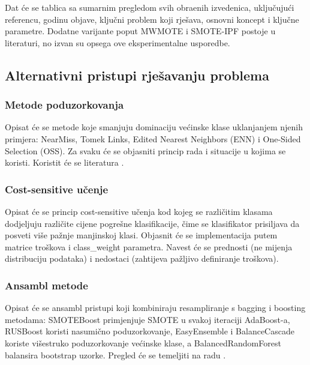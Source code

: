 Dat \'{c}e se tablica sa sumarnim pregledom svih obra\dj{}enih izvedenica,
uklju\v{c}uju\'{c}i referencu, godinu objave, klju\v{c}ni problem koji
rje\v{s}ava, osnovni koncept i klju\v{c}ne parametre. Dodatne varijante
poput MWMOTE \cite{barua2014} i SMOTE-IPF \cite{saez2015} postoje u
literaturi, no izvan su opsega ove eksperimentalne usporedbe.

\subsection{Alternativni pristupi rje\v{s}avanju problema}

\subsubsection{Metode poduzorkovanja}

Opisat \'{c}e se metode koje smanjuju dominaciju ve\'{c}inske klase
uklanjanjem njenih primjera: NearMiss, Tomek Links, Edited Nearest
Neighbors (ENN) i One-Sided Selection (OSS). Za svaku \'{c}e se objasniti
princip rada i situacije u kojima se koristi. Koristit \'{c}e se
literatura \cite{batista2004,liu2009}.

\subsubsection{Cost-sensitive u\v{c}enje}

Opisat \'{c}e se princip cost-sensitive u\v{c}enja \cite{elkan2001} kod
kojeg se razli\v{c}itim klasama dodjeljuju razli\v{c}ite cijene pogre\v{s}ne
klasifikacije, \v{c}ime se klasifikator prisiljava da posveti vi\v{s}e
pa\v{z}nje manjinskoj klasi. Objasnit \'{c}e se implementacija putem
matrice tro\v{s}kova i class\_weight parametra. Navest \'{c}e se prednosti
(ne mijenja distribuciju podataka) i nedostaci (zahtijeva pa\v{z}ljivo
definiranje tro\v{s}kova).

\subsubsection{Ansambl metode}

Opisat \'{c}e se ansambl pristupi koji kombiniraju resampliranje s
bagging i boosting metodama: SMOTEBoost \cite{chawla2003} primjenjuje
SMOTE u svakoj iteraciji AdaBoost-a, RUSBoost \cite{seiffert2010} koristi
nasumi\v{c}no poduzorkovanje, EasyEnsemble i BalanceCascade \cite{liu2009}
koriste vi\v{s}estruko poduzorkovanje ve\'{c}inske klase, a
BalancedRandomForest balansira bootstrap uzorke. Pregled \'{c}e se
temeljiti na radu \cite{galar2012}.

